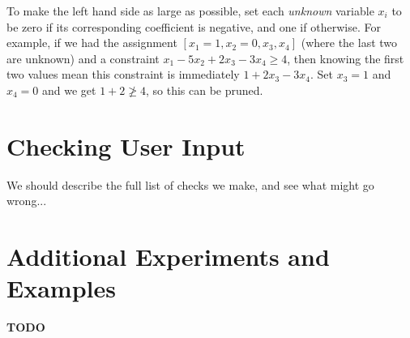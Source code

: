 \documentclass{article}
\begin{document}
To make the left hand side as large as possible, set each \emph{unknown} variable $x_i$ to be zero if its corresponding coefficient is negative, and
one if otherwise. For example, if we had the assignment $[x_1=1, x_2=0, x_3, x_4]$ (where the last two are unknown) and a constraint $x_1 - 5x_2 +
2x_3 -3x_4 \ge 4$, then knowing the first two values mean this constraint is immediately $1 + 2x_3 - 3x_4$. Set $x_3=1$ and $x_4=0$ and we get $1+2
\not \ge 4$, so this can be pruned.




\section{Checking User Input}\label{app:input_check}

We should describe the full list of checks we make, and see what might go wrong...

\section{Additional Experiments and Examples}\label{app:additional_experiments_and_examples}

{\bf TODO}

\end{document}
